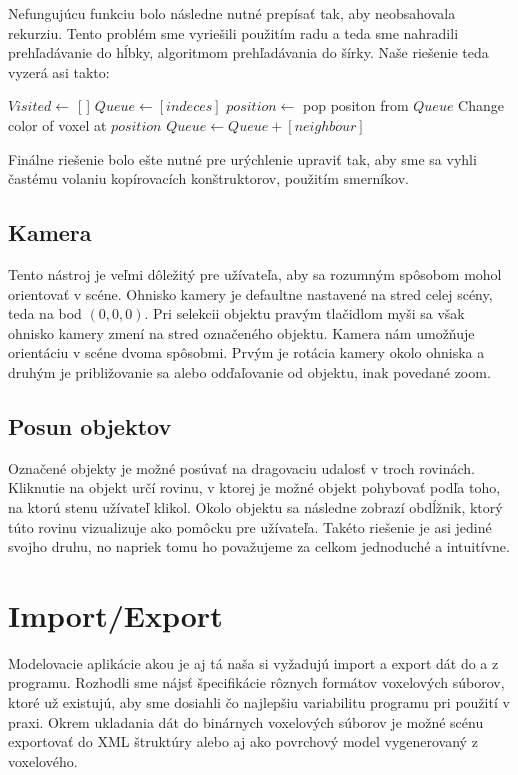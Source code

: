	Nefungujúcu funkciu bolo následne nutné prepísať tak, aby neobsahovala rekurziu. Tento problém sme vyriešili použitím radu a teda sme nahradili prehľadávanie do hĺbky, algoritmom prehľadávania do šírky.
	Naše riešenie teda vyzerá asi takto:
	
	\eject
	
	\begin{algorithmic}
			\State $Visited \gets$ [ ]
			\State $Queue \gets [indeces]$
			\Repeat  
				\State $position \gets$ pop positon from $Queue$
					\State Change color of voxel at $position$
						\State $Queue \gets Queue + [neighbour]$
					\EndFor
				\EndIf 
		\EndFunction \\
	\end{algorithmic} 
	
	{Finálne riešenie bolo ešte nutné pre urýchlenie upraviť tak, aby sme sa vyhli častému volaniu kopírovacích konštruktorov, použitím smerníkov.}
\subsection{Kamera}
	Tento nástroj je veľmi dôležitý pre užívateľa, aby sa rozumným spôsobom mohol orientovať v scéne. Ohnisko kamery je defaultne nastavené na stred celej scény, teda na bod $(0,0,0)$. Pri selekcii objektu pravým tlačidlom myši sa však ohnisko kamery zmení na stred označeného objektu.
	Kamera nám umožňuje orientáciu v scéne dvoma spôsobmi. Prvým je rotácia kamery okolo ohniska a druhým je približovanie sa alebo odďaľovanie od objektu, inak povedané zoom.
\subsection{Posun objektov}\label{moveTool}
	Označené objekty je možné posúvať na dragovaciu udalosť v troch rovinách. \\
	Kliknutie na objekt určí rovinu, v ktorej je možné objekt pohybovať podľa toho, na ktorú stenu užívateľ klikol. Okolo objektu sa následne zobrazí obdĺžnik, ktorý túto rovinu vizualizuje ako pomôcku pre užívateľa. Takéto riešenie je asi jediné svojho druhu, no napriek tomu ho považujeme za celkom jednoduché a intuitívne.


\section{Import/Export}\label{sec:io}
Modelovacie aplikácie akou je aj tá naša si vyžadujú import a export dát do a z programu. Rozhodli sme nájsť špecifikácie rôznych formátov voxelových súborov, ktoré už existujú, aby sme dosiahli čo najlepšiu variabilitu programu pri použití v praxi. Okrem ukladania dát do binárnych voxelových súborov je možné scénu exportovať do XML štruktúry alebo aj ako povrchový model vygenerovaný z voxelového.
